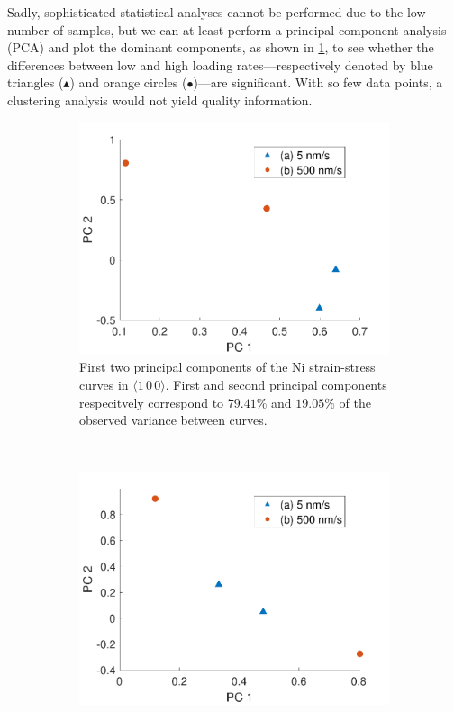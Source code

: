 Sadly, sophisticated statistical analyses cannot be performed due to the low number of samples, but we can at least perform a principal component analysis (PCA) and plot the dominant components, as shown in \cref{sf:Ni100_pca}, to see whether the differences between low and high loading rates---respectively denoted by blue triangles (\textcolor{matlabBlue}{$\blacktriangle$}) and orange circles (\textcolor{matlabOrange}{$\bullet$})---are significant. With so few data points, a clustering analysis would not yield quality information.
\begin{figure}
    \centering
    \begin{subfigure}[t]{0.45\linewidth}
        \centering
        \includegraphics[width=\linewidth]{../data/Ni100_pca.pdf}
        \caption[First two principal components of the Ni strain-stress curves in $\langle 1\,0\,0 \rangle$.]{First two principal components of the Ni strain-stress curves in $\langle 1\,0\,0 \rangle$. First and second principal components respecitvely correspond to $79.41\%$ and $19.05\%$ of the observed variance between curves.}
        \label{sf:Ni100_pca}
    \end{subfigure}
    ~
    \begin{subfigure}[t]{0.45\linewidth}
        \centering
        \includegraphics[width=\linewidth]{../data/Ni110_pca.pdf}

\end{subfigure}
\end{figure}
